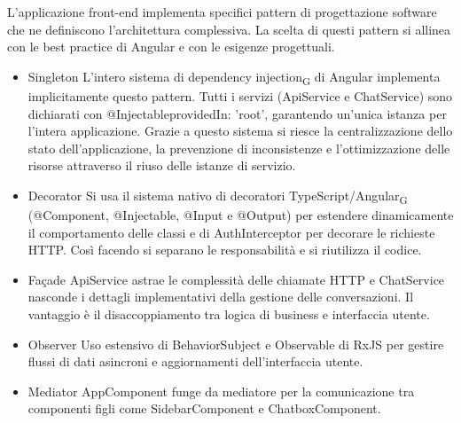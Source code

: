 L'applicazione front-end implementa specifici pattern di progettazione software che ne definiscono l'architettura complessiva. La scelta di questi pattern si allinea con le best practice di Angular e con le esigenze progettuali.
\begin{itemize}
    \item Singleton
    \newline\newline L'intero sistema di dependency injection\textsubscript{G} di Angular implementa implicitamente questo pattern. Tutti i servizi (ApiService e ChatService) sono dichiarati con @Injectable{providedIn: 'root'}, garantendo un'unica istanza per l'intera applicazione. Grazie a questo sistema si riesce la centralizzazione dello stato dell'applicazione, la prevenzione di inconsistenze e l'ottimizzazione delle risorse attraverso il riuso delle istanze di servizio. 
\end{itemize}
\begin{itemize}
    \item Decorator
    \newline\newline Si usa il sistema nativo di decoratori TypeScript/Angular\textsubscript{G} (@Component, @Injectable, @Input e @Output) per estendere dinamicamente il comportamento delle classi e di AuthInterceptor per decorare le richieste HTTP. Così facendo si separano le responsabilità e si riutilizza il codice.
    \item Façade
    \newline\newline ApiService astrae le complessità delle chiamate HTTP e ChatService nasconde i dettagli implementativi della gestione delle conversazioni. Il vantaggio è il disaccoppiamento tra logica di business e interfaccia utente. 
\end{itemize}
\begin{itemize}
    \item Observer
    \newline\newline Uso estensivo di BehaviorSubject e Observable di RxJS per gestire flussi di dati asincroni e aggiornamenti dell'interfaccia utente. 
    \item Mediator
    \newline\newline AppComponent funge da mediatore per la comunicazione tra componenti figli come SidebarComponent e ChatboxComponent. 
\end{itemize}
